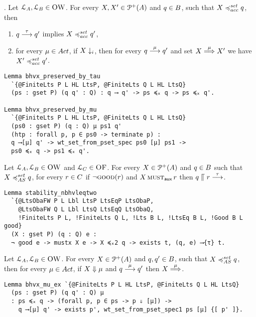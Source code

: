 .
Let $\mathcal{L}_A, \mathcal{L}_B \in \textsc{OW}$.
For every
$X, X' \in \mathcal{P}^{+}( A )$ and $ q \in B$,
such that $X \accleqset \serverB$, then
\begin{enumerate}
\item
  $q \mathrel{\overset{ \tau }\longrightarrow} q'$ implies $X \accleqset \serverB'$,
\item
  for every $\mu \in \Act$,
  if $X \downarrow_i$, then for every  $q \mathrel{\overset{\mu}\longrightarrow} q'$ and set $X \mathrel{\overset{\mu} \Longrightarrow} X'$
  we have $X' \accleqset \serverB'$.
\end{enumerate}

\begin{mdframed}
\begin{verbatim}
Lemma bhvx_preserved_by_tau
  `{@FiniteLts P L HL LtsP, @FiniteLts Q L HL LtsQ}
  (ps : gset P) (q q' : Q) : q ⟶ q' -> ps ≼ₓ q -> ps ≼ₓ q'.

Lemma bhvx_preserved_by_mu
  `{@FiniteLts P L HL LtsP, @FiniteLts Q L HL LtsQ}
  (ps0 : gset P) (q : Q) μ ps1 q'
  (htp : forall p, p ∈ ps0 -> terminate p) :
  q ⟶[μ] q' -> wt_set_from_pset_spec ps0 [μ] ps1 ->
  ps0 ≼ₓ q -> ps1 ≼ₓ q'.
\end{verbatim}
\end{mdframed}

Let $\mathcal{L}_A, \mathcal{L}_B \in \textsc{OW}$ and $\mathcal{L}_C \in \textsc{OF}$.
For every $X \in \mathcal{P}^{+}( A )$ and
$q \in B $ such that
$X \asleqset \serverB$, for every $r \in C$
if $\lnot \textsc{good}(r)$ and $X \operatorname{\textsc{must}}_{\textsf{aux}} r$
then $q \mathrel{\llceil} r \mathrel{\overset{\tau}\longrightarrow}$.

\begin{mdframed}
\begin{verbatim}
Lemma stability_nbhvleqtwo
  `{@LtsObaFW P L Lbl LtsP LtsEqP LtsObaP,
    @LtsObaFW Q L Lbl LtsQ LtsEqQ LtsObaQ,
    !FiniteLts P L, !FiniteLts Q L, !Lts B L, !LtsEq B L, !Good B L good}
  (X : gset P) (q : Q) e :
  ¬ good e -> mustx X e -> X ≼ₓ2 q -> exists t, (q, e) ⟶{τ} t.
\end{verbatim}
\end{mdframed}

Let $\mathcal{L}_A, \mathcal{L}_B \in \textsc{OW}$.
For every $X \in \mathcal{P}^{+}( A )$ and
$q, q' \in B$,
such that $X \asleqset \serverB$, then
for every $\mu \in \Act$, if $X \mathrel{\Downarrow} \mu$ and $q \mathrel{\overset{\mu}\longrightarrow} q'$ then $X \mathrel{\overset{\mu} \Longrightarrow}$.
\begin{mdframed}
\begin{verbatim}
Lemma bhvx_mu_ex `{@FiniteLts P L HL LtsP, @FiniteLts Q L HL LtsQ}
  (ps : gset P) (q q' : Q) μ
  : ps ≼ₓ q -> (forall p, p ∈ ps -> p ⇓ [μ]) ->
    q ⟶[μ] q' -> exists p', wt_set_from_pset_spec1 ps [μ] {[ p' ]}.
\end{verbatim}
\end{mdframed}


